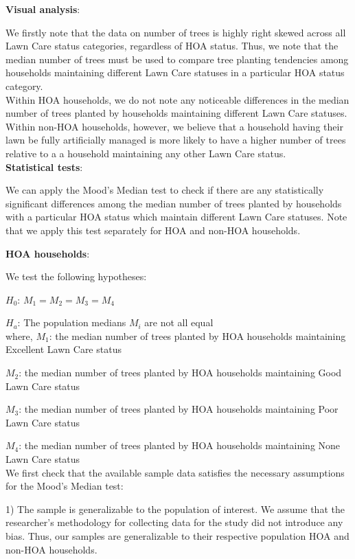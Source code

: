 \documentclass{article}
\begin{document}
\textbf{Visual analysis}:

We firstly note that the data on number of trees is highly right skewed across all Lawn Care status categories, regardless of HOA status. Thus, we note that the median number of trees must be used to compare tree planting tendencies among households maintaining different Lawn Care statuses in a particular HOA status category. \\

Within HOA households, we do not note any noticeable differences in the median number of trees planted by households maintaining different Lawn Care statuses. Within non-HOA households, however, we believe that a household having their lawn be fully artificially managed is more likely to have a higher number of trees relative to a a household maintaining any other Lawn Care status.\\

\textbf{Statistical tests}:

We can apply the Mood's Median test to check if there are any statistically significant differences among the median number of trees planted by households with a particular HOA status which maintain different Lawn Care statuses. Note that we apply this test separately for HOA and non-HOA households.

\textbf{HOA households}:

We test the following hypotheses:

$H_{0}$: $M_{1}=M_{2}=M_{3}=M_{4}$

$H_{a}$: The population medians $M_{i}$ are not all equal\\

where, $M_{1}$: the median number of trees planted by HOA households maintaining Excellent Lawn Care status

$M_{2}$: the median number of trees planted by HOA households maintaining Good Lawn Care status

$M_{3}$: the median number of trees planted by HOA households maintaining Poor Lawn Care status

$M_{4}$: the median number of trees planted by HOA households maintaining None Lawn Care status\\

We first check that the available sample data satisfies the necessary assumptions for the Mood's Median test:

1) The sample is generalizable to the population of interest. We assume that the researcher's methodology for collecting data for the study did not introduce any bias. Thus, our samples are generalizable to their respective population HOA and non-HOA households.\\
\end{document}
